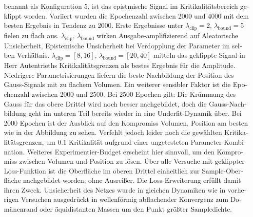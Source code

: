 \begin{otherlanguage}{ngerman}
benannt als Konfiguration 5, ist das epistmische Signal im Kritikalitätsbereich geklippt worden. Variiert wurden die Epochenzahl zwischen 2000 und 4000 mit dem besten Ergebnis in Tendenz zu 2000. Erste Ergebnisse unter $\lambda_{\text{clip}}=2$, $\lambda_{\text{bound}}=5$ fielen zu flach aus. $\lambda_{\text{clip}}$, $\lambda_{\text{bound}}$ wirken Ausgabe-amplifizierend auf \gls{Aleatorische Unsicherheit}, \gls{Epistemische Unsicherheit} bei Verdopplung der Parameter im selben Verhältnis. $\lambda_{\text{clip}}=[8, 16]$, $\lambda_{\text{bound}}=[20, 40]$ mitteln das geklippte Signal in Herr Autentrieths Kritikalitätsgrenzen als bestes Ergebnis für die Amplitude. Niedrigere Parametrisierungen liefern die beste Nachbildung der Position des Gauss-Signals mit zu flachem Volumen. Ein weiterer sensibler Faktor ist die Epochenzahl zwischen 2000 und 2500. Bei 2500 Epochen gilt: Die Krümmung des Gauss für das obere Drittel wird noch besser nachgebildet, doch die Gauss-Nachbildung geht im unteren Teil bereits wieder in eine Underfit-Dynamik über. Bei 2000 Epochen ist der Ausblick auf den Kompromiss Volumen, Position am besten wie in der Abbildung zu sehen. Verfehlt jedoch leider noch die gewählten Kritikalitätsgrenzen, um 0.1 Kritikalität aufgrund einer ungetesteten Parameter-Kombination. Weiteres Experimentier-Budget erscheint hier sinnvoll, um den Kompromiss zwischen Volumen und Position zu lösen. Über alle Versuche mit geklippter Loss-Funktion ist die Oberfläche im oberen Drittel einheitlich zur Sample-Oberfläche nachgebildet worden, ohne Ausreißer. Die Loss-Erweiterung erfüllt damit ihren Zweck. Unsicherheit des Netzes wurde in gleichen Dynamiken wie in vorherigen Versuchen ausgedrückt in wellenförmig abflachender Konvergenz zum Domänenrand oder äquidistanten Massen um den Punkt größter Sampledichte.


\begin{figure}[!ht]
  \centering


\end{figure}
\end{otherlanguage}

